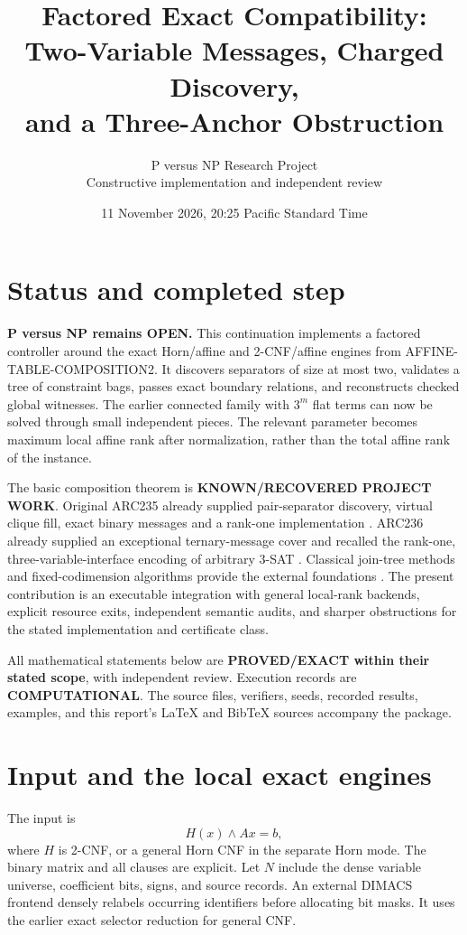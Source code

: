 \documentclass[11pt]{article}
\title{Factored Exact Compatibility:\\Two-Variable Messages, Charged Discovery,\\and a Three-Anchor Obstruction}
\author{P versus NP Research Project\\Constructive implementation and independent review}
\date{11 November 2026, 20:25 Pacific Standard Time}
\begin{document}
\maketitle

\section*{Status and completed step}
\textbf{P versus NP remains OPEN.} This continuation implements a factored
controller around the exact Horn/affine and 2-CNF/affine engines from
AFFINE-TABLE-COMPOSITION2. It discovers separators of size at most two,
validates a tree of constraint bags, passes exact boundary relations, and
reconstructs checked global witnesses. The earlier connected family with
\(3^m\) flat terms can now be solved through small independent pieces.
The relevant parameter becomes maximum local affine rank after normalization,
rather than the total affine rank of the instance.

The basic composition theorem is \textbf{KNOWN/RECOVERED PROJECT WORK}.
Original ARC235 already supplied pair-separator discovery, virtual clique fill,
exact binary messages and a rank-one implementation \cite{arc235}.
ARC236 already supplied an exceptional ternary-message cover and recalled
the rank-one, three-variable-interface encoding of arbitrary 3-SAT
\cite{arc236}. Classical join-tree methods and fixed-codimension algorithms
provide the external foundations \cite{dechter1988,arvind2021,brakensiek2019}.
The present contribution is an executable integration with general local-rank
backends, explicit resource exits, independent semantic audits, and sharper
obstructions for the stated implementation and certificate class.

All mathematical statements below are \textbf{PROVED/EXACT within their stated
scope}, with independent review. Execution records are \textbf{COMPUTATIONAL}.
The source files, verifiers, seeds, recorded results, examples, and this report's
LaTeX and BibTeX sources accompany the package.

\section{Input and the local exact engines}
The input is
\[
 H(x)\land Ax=b,
\]
where \(H\) is 2-CNF, or a general Horn CNF in the separate Horn mode.
The binary matrix and all clauses are explicit. Let \(N\) include the dense
variable universe, coefficient bits, signs, and source records. An external
DIMACS frontend densely relabels occurring identifiers before allocating
bit masks. It uses the earlier exact selector reduction for general CNF.
\end{document}
